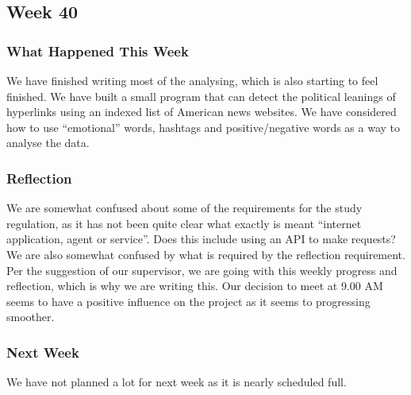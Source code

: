 \subsection{Week 40}
\subsubsection{What Happened This Week}
We have finished writing most of the analysing, which is also starting to feel
finished. We have built a small program that can detect the political leanings
of hyperlinks using an indexed list of American news websites. We have
considered how to use ``emotional'' words, hashtags and positive/negative words
as a way to analyse the data.

\subsubsection{Reflection}
We are somewhat confused about some of the requirements for the study
regulation, as it has not been quite clear what exactly is meant ``internet
application, agent or service''. Does this include using an API to make
requests? We are also somewhat confused by what is required by the reflection
requirement. Per the suggestion of our supervisor, we are going with this
weekly progress and reflection, which is why we are writing this. Our decision
to meet at 9.00 AM seems to have a positive influence on the project as it
seems to progressing smoother.

\subsubsection{Next Week} 
We have not planned a lot for next week as it is nearly scheduled full.



% 

